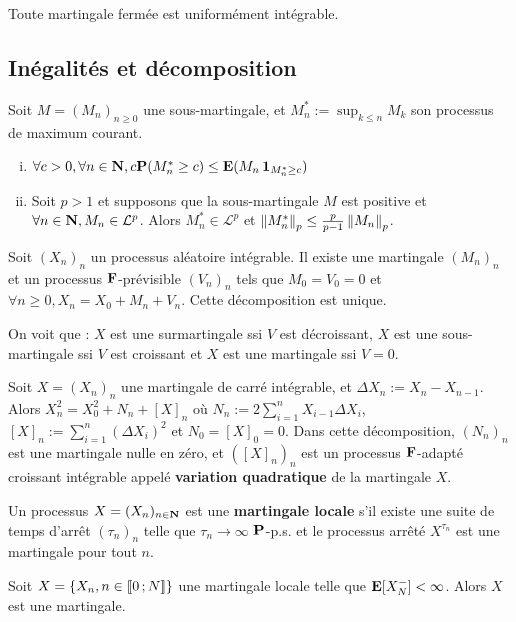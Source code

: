	\begin{thm}
		Toute martingale fermée est uniformément intégrable.
	\end{thm}


\subsection{Inégalités et décomposition}

	\begin{thm}
		Soit $M = (M_n)_{n \geq 0}$ une sous-martingale, et $M_n^* := \sup_{k \leq n} M_k$ son processus de maximum courant.
		\begin{enumerate}[(i)]
			\item $\forall c > 0, \forall n \in \mathbf{N}, c \mathbf{P}(M_n^* \geq c) \leq \mathbf{E}(M_n \operatorname{\mathbf{1}}_{M_n^* \geq c})$
			\item Soit $p > 1$ et supposons que la sous-martingale $M$ est positive et $\forall n \in \mathbf{N}, M_n \in \mathcal{L}^p$.
				Alors $M_n^* \in \mathcal{L}^p$ et $\left\lVert M_n^*\right\rVert_p \leq \frac{p}{p - 1} \left\lVert M_n\right\rVert_p$.
		\end{enumerate}
	\end{thm}

	\begin{pop}
		Soit $(X_n)_n$ un processus aléatoire intégrable.
		Il existe une martingale $(M_n)_n$ et un processus $\mathbf{F}$-prévisible $(V_n)_n$ tels que $M_0 = V_0 = 0$ et $\forall n \geq 0, X_n = X_0 + M_n + V_n$.
		Cette décomposition est unique.
	\end{pop}

	\begin{rem}
		On voit que : $X$ est une surmartingale ssi $V$ est décroissant, $X$ est une sous-martingale ssi $V$ est croissant et $X$ est une martingale ssi $V = 0$.
	\end{rem}

	\begin{pop}
		Soit $X = (X_n)_n$ une martingale de carré intégrable, et $\Delta X_n := X_n - X_{n - 1}$.
		Alors $X_n^2 = X_0^2 + N_n + [X]_n$ où $N_n := 2 \sum_{i = 1}^n  X_{i - 1} \Delta X_i$, $[X]_n := \sum_{i = 1}^n (\Delta X_i)^2$ et $N_0 = [X]_0 = 0$.
		Dans cette décomposition, $(N_n)_n$ est une martingale nulle en zéro, et $([X]_n)_n$ est un processus $\mathbf{F}$-adapté croissant intégrable appelé \textbf{variation quadratique} de la martingale $X$.
	\end{pop}

	\begin{defn}
		Un processus $X = (X_n)_{n \in \mathbf{N}}$ est une \textbf{martingale locale} s'il existe une suite de temps d'arrêt $(\tau_n)_n$ telle que $\tau_n \longrightarrow \infty$ $\mathbf{P}$-p.s. et le processus arrêté $X^{\tau_n}$ est une martingale pour tout $n$.
	\end{defn}

	\begin{lem}
		Soit $X = \{ X_n, n \in \mathopen{}\mathclose{\left[\![0\mathclose{}\mathpunct{};N\right]\!]} \}$ une martingale locale telle que $\mathbf{E}[X_N^-] < \infty$.
		Alors $X$ est une martingale.
	\end{lem}

